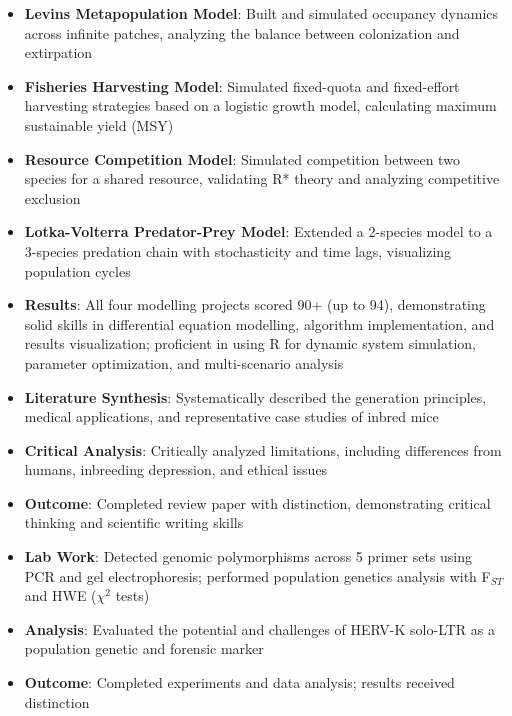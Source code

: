 \documentclass{my-resume}
\begin{document}
\begin{itemize}[parsep=0.2ex]
  \item \textbf{Levins Metapopulation Model}: Built and simulated occupancy dynamics across infinite patches, analyzing the balance between colonization and extirpation
  \item \textbf{Fisheries Harvesting Model}: Simulated fixed-quota and fixed-effort harvesting strategies based on a logistic growth model, calculating maximum sustainable yield (MSY)
  \item \textbf{Resource Competition Model}: Simulated competition between two species for a shared resource, validating R* theory and analyzing competitive exclusion
  \item \textbf{Lotka-Volterra Predator-Prey Model}: Extended a 2-species model to a 3-species predation chain with stochasticity and time lags, visualizing population cycles
  \item \textbf{Results}: All four modelling projects scored 90+ (up to 94), demonstrating solid skills in differential equation modelling, algorithm implementation, and results visualization; proficient in using R for dynamic system simulation, parameter optimization, and multi-scenario analysis
\end{itemize}

\begin{itemize}[parsep=0.2ex]
  \item \textbf{Literature Synthesis}: Systematically described the generation principles, medical applications, and representative case studies of inbred mice
  \item \textbf{Critical Analysis}: Critically analyzed limitations, including differences from humans, inbreeding depression, and ethical issues
  \item \textbf{Outcome}: Completed review paper with distinction, demonstrating critical thinking and scientific writing skills
\end{itemize}

\begin{itemize}[parsep=0.2ex]
  \item \textbf{Lab Work}: Detected genomic polymorphisms across 5 primer sets using PCR and gel electrophoresis; performed population genetics analysis with F$_{ST}$ and HWE ($\chi^2$ tests)
  \item \textbf{Analysis}: Evaluated the potential and challenges of HERV-K solo-LTR as a population genetic and forensic marker
  \item \textbf{Outcome}: Completed experiments and data analysis; results received distinction
\end{itemize}
\end{document}
